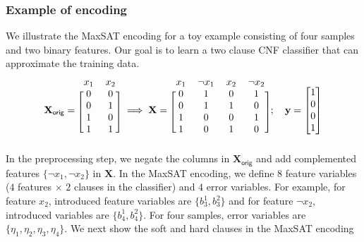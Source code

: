 \subsubsection*{Example of encoding}

We illustrate the MaxSAT encoding for a toy example consisting of four samples and two binary features. Our goal is to learn a two clause CNF classifier that can approximate the training data. 
\[ 
\mathbf{X}_\mathsf{orig} = 
\begin{blockarray}{cc}
x_1 & x_2 \\
\begin{block}{[cc]}
0 & 0 \\
0 & 1 \\
1 & 0 \\
1 & 1 \\
\end{block}
\end{blockarray} \implies 
\mathbf{X} = 
\begin{blockarray}{cccc}
x_1 & \neg x_1 & x_2  & \neg x_2\\
\begin{block}{[cccc]}
0 & 1 & 0 & 1\\
0 & 1 & 1 & 0\\
1 & 0 & 0 & 1\\
1 & 0 & 1 & 0\\
\end{block}
\end{blockarray}; \quad 
\mathbf{y} = 
\begin{bmatrix} 
1 \\ 0 \\ 0 \\ 1
\end{bmatrix}
\]
In the preprocessing step, we negate the columns in $ \mathbf{X}_\mathsf{orig} $ and add complemented features $ \{\neg x_1, \neg x_2\} $ in $ \mathbf{X} $. In the MaxSAT encoding, we define $ 8 $ feature variables ($ 4 $ features $ \times $ $ 2 $ clauses in the classifier) and $ 4 $ error variables. For example, for feature $ x_2 $, introduced feature variables are $ \{b^1_3, b^2_3\} $ and for feature $ \neg x_2 $, introduced variables are $ \{b^1_4, b^2_4\} $. For four samples, error variables are $ \{\eta_1, \eta_2, \eta_3, \eta_4\} $. We next show the soft and hard clauses in the MaxSAT encoding


